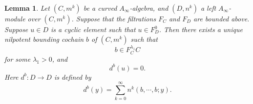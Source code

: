 \documentclass{amsart}
\newtheorem{lemma}[theorem]{Lemma}
\numberwithin{equation}{section}
\numberwithin{figure}{section}
\begin{document}
\begin{lemma} \label{cyclic element and bounding cochain}
	Let $(C, m^{k})$ be a curved $A_{\infty}$-algebra, and $(D, n^{k})$ a left $A_{\infty}$-module over $(C, m^{k})$. Suppose that the filtrations $F_{C}$ and $F_{D}$ are bounded above. Suppose $u \in D$ is a cyclic element such that $u \in F_{D}^{0}$. Then there exists a unique nilpotent bounding cochain $b$ of $(C, m^{k})$ such that
\begin{equation*}
b \in F_{C}^{\lambda_{1}} C
\end{equation*}
for some $\lambda_{1} > 0$, and
\begin{equation}\label{cyclic element is closed under the deformed differential}
d^{b}(u) = 0.
\end{equation}
Here $d^{b}: D \to D$ is defined by
\begin{equation*}
d^{b}(y) = \sum_{k=0}^{\infty} n^{k}(b, \cdots, b; y).
\end{equation*}
\end{lemma}
\end{document}
